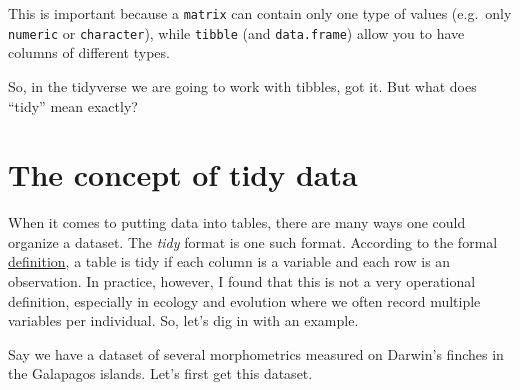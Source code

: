 \documentclass[]{book}
\begin{document}
This is important because a \texttt{matrix} can contain only one type of values (e.g.~only \texttt{numeric} or \texttt{character}), while \texttt{tibble} (and \texttt{data.frame}) allow you to have columns of different types.

So, in the tidyverse we are going to work with tibbles, got it. But what does ``tidy'' mean exactly?

\hypertarget{the-concept-of-tidy-data}{%
\section{The concept of tidy data}\label{the-concept-of-tidy-data}}

When it comes to putting data into tables, there are many ways one could organize a dataset. The \emph{tidy} format is one such format. According to the formal \href{https://tidyr.tidyverse.org/articles/tidy-data.html}{definition}, a table is tidy if each column is a variable and each row is an observation. In practice, however, I found that this is not a very operational definition, especially in ecology and evolution where we often record multiple variables per individual. So, let's dig in with an example.

Say we have a dataset of several morphometrics measured on Darwin's finches in the Galapagos islands. Let's first get this dataset.
\end{document}
